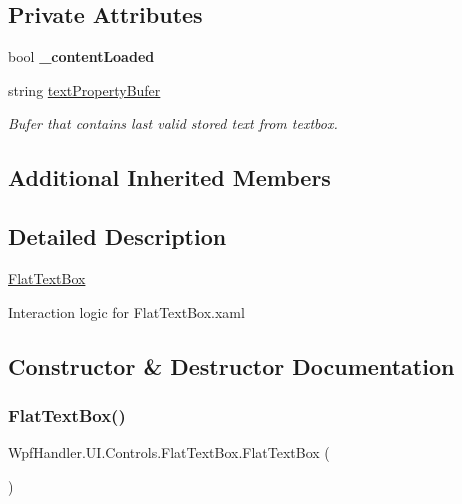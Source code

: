 \subsection*{Private Attributes}
\begin{DoxyCompactItemize}
\item 
\mbox{\label{class_wpf_handler_1_1_u_i_1_1_controls_1_1_flat_text_box_a5ac3253617414dfd0210d24542359afb}} 
bool {\bfseries \+\_\+content\+Loaded}
\item 
string \mbox{\hyperlink{class_wpf_handler_1_1_u_i_1_1_controls_1_1_flat_text_box_a749af03c71b6c8f4b0075af04535a03c}{text\+Property\+Bufer}}
\begin{DoxyCompactList}\small\item\em Bufer that contains last valid stored text from textbox. \end{DoxyCompactList}\end{DoxyCompactItemize}
\subsection*{Additional Inherited Members}


\subsection{Detailed Description}
\mbox{\hyperlink{class_wpf_handler_1_1_u_i_1_1_controls_1_1_flat_text_box}{Flat\+Text\+Box}} 

Interaction logic for Flat\+Text\+Box.\+xaml 

\subsection{Constructor \& Destructor Documentation}
\mbox{\label{class_wpf_handler_1_1_u_i_1_1_controls_1_1_flat_text_box_aefe884a51110f8fc9546ce2c86fcf574}} 
\subsubsection{\texorpdfstring{Flat\+Text\+Box()}{FlatTextBox()}}
{\footnotesize\ttfamily Wpf\+Handler.\+U\+I.\+Controls.\+Flat\+Text\+Box.\+Flat\+Text\+Box (\begin{DoxyParamCaption}{ }\end{DoxyParamCaption})}



